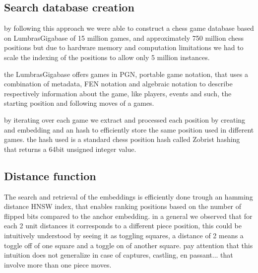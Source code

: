 \subsection{Search database creation}
by following this approach we were able to construct a chess game database based on LumbrasGigabase \cite{retrieval:lumbrasgigabase} of 15 million games, 
and approximately 750 million chess positions but due to hardware memory and computation limitations we had to scale the indexing of the positions to allow only 5 million instances.

the LumbrasGigabase offers games in PGN, portable game notation, that uses a combination of metadata, FEN notation and algebraic notation to describe 
respectively information about the game, like players, events and such, the starting position and following moves of a games.


by iterating over each game we extract and processed each position by creating and embedding and an hash to efficiently store the same position used in different games.
the hash used is a standard chess position hash called Zobrist hashing \cite{retrieval:zobristhash} that returns a 64bit unsigned integer value.



\subsection{Distance function}
The search and retrieval of the embeddings is efficiently done trough an hamming distance HNSW index, that enables 
ranking positions based on the number of flipped bits compared to the anchor embedding.
in a general we observed that for each 2 unit distances it corresponds to a different piece position, this could be intuitively understood 
by seeing it as toggling squares, a distance of 2 means a toggle off of one square 
and a toggle on of another square.
pay attention that this intuition does not generalize in case of captures, castling, en passant... that involve more than one piece moves.